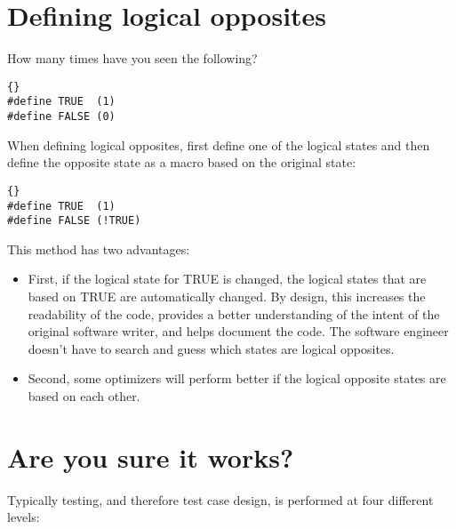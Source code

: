 \documentclass{report}
\begin{document}
\section{Defining logical opposites}
How many times have you seen the following? 
\begin{lstlisting}{}
#define TRUE  (1)
#define FALSE (0)
\end{lstlisting}
When defining logical opposites, first define one of the logical states and then define the opposite state as a macro based on the original state: 
\begin{lstlisting}{}
#define TRUE  (1)
#define FALSE (!TRUE)
\end{lstlisting}
This method has two advantages:
\begin{itemize}
\item First, if the logical state for TRUE is changed, the logical states that are based on TRUE are automatically changed. By design, this increases the readability of the code, provides a better understanding of the intent of the original software writer, and helps document the code. The software engineer doesn't have to search and guess which states are logical opposites. 
\item Second, some optimizers will perform better if the logical opposite states are based on each other.
\end{itemize}

\section{Are you sure it works?}
Typically testing, and therefore test case design, is performed at four different levels:
\end{document}
